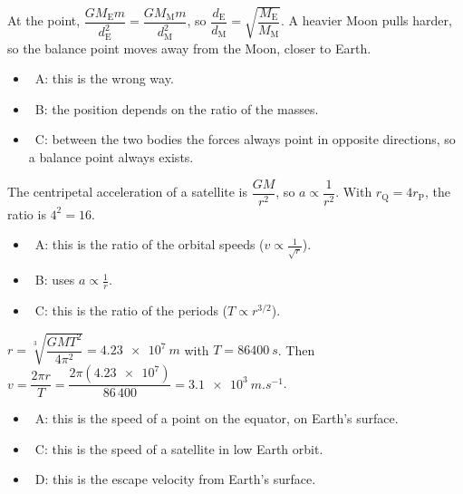 \documentclass[12pt]{article}
\begin{document}
\begin{practiceanswers}
\begin{practiceans}
  At the point, $\dfrac{GM_\mathrm{E}m}{d_\mathrm{E}^2} = \dfrac{GM_\mathrm{M}m}{d_\mathrm{M}^2}$, so
  $\dfrac{d_\mathrm{E}}{d_\mathrm{M}} = \sqrt{\dfrac{M_\mathrm{E}}{M_\mathrm{M}}}$. A heavier Moon pulls
  harder, so the balance point moves away from the Moon, closer to Earth.
  \begin{itemize}
    \item \xmark\ A: this is the wrong way.
    \item \xmark\ B: the position depends on the ratio of the masses.
    \item \xmark\ C: between the two bodies the forces always point in opposite directions, so a
          balance point always exists.
  \end{itemize}
\end{practiceans}

\begin{practiceans}
  The centripetal acceleration of a satellite is $\dfrac{GM}{r^2}$, so $a \propto \dfrac{1}{r^2}$.
  With $r_\mathrm{Q} = 4r_\mathrm{P}$, the ratio is $4^2 = 16$.
  \begin{itemize}
    \item \xmark\ A: this is the ratio of the orbital speeds ($v \propto \frac{1}{\sqrt{r}}$).
    \item \xmark\ B: uses $a \propto \frac{1}{r}$.
    \item \xmark\ C: this is the ratio of the periods ($T \propto r^{3/2}$).
  \end{itemize}
\end{practiceans}

\begin{practiceans}
  $r = \sqrt[3]{\dfrac{GMT^2}{4\pi^2}} = \qty{4.23e7}{m}$ with $T = \qty{86400}{s}$. Then
  $v = \dfrac{2\pi r}{T} = \dfrac{2\pi(\num{4.23e7})}{86\,400} = \qty{3.1e3}{m.s^{-1}}$.
  \begin{itemize}
    \item \xmark\ A: this is the speed of a point on the equator, on Earth's surface.
    \item \xmark\ C: this is the speed of a satellite in low Earth orbit.
    \item \xmark\ D: this is the escape velocity from Earth's surface.
  \end{itemize}
\end{practiceans}


\end{practiceanswers}
\end{document}
